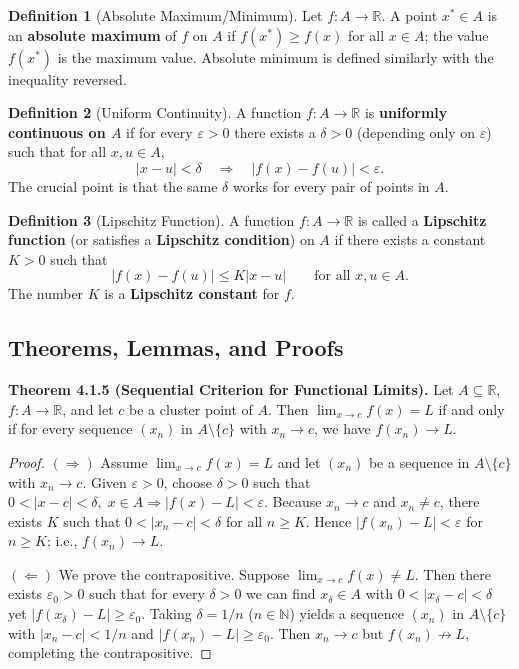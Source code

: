 \documentclass[12pt,a4paper]{article}
\theoremstyle{definition}
\newtheorem*{definition}{Definition}
\newcommand{\R}{\mathbb{R}}
\newcommand{\N}{\mathbb{N}}
\newcommand{\eps}{\varepsilon}
\newcommand{\abs}[1]{\left\lvert#1\right\rvert}
\begin{document}
\begin{definition}[Absolute Maximum/Minimum]
Let \(f:A\to\R\). A point \(x^*\in A\) is an \textbf{absolute maximum} of \(f\) on \(A\) if \(f(x^*)\ge f(x)\) for all \(x\in A\); the value \(f(x^*)\) is the maximum value. Absolute minimum is defined similarly with the inequality reversed.
\end{definition}

\begin{definition}[Uniform Continuity]
A function \(f:A\to\R\) is \textbf{uniformly continuous on \(A\)} if for every \(\eps>0\) there exists a \(\delta>0\) (depending only on \(\eps\)) such that for all \(x,u\in A\),
\[
\abs{x-u}<\delta \quad\Longrightarrow\quad \abs{f(x)-f(u)}<\eps.
\]
The crucial point is that the same \(\delta\) works for every pair of points in \(A\).
\end{definition}

\begin{definition}[Lipschitz Function]
A function \(f:A\to\R\) is called a \textbf{Lipschitz function} (or satisfies a \textbf{Lipschitz condition}) on \(A\) if there exists a constant \(K>0\) such that
\[
\abs{f(x)-f(u)} \le K\abs{x-u} \qquad\text{for all } x,u\in A.
\]
The number \(K\) is a \textbf{Lipschitz constant} for \(f\).
\end{definition}

\subsection{Theorems, Lemmas, and Proofs}

\textbf{Theorem 4.1.5 (Sequential Criterion for Functional Limits).} Let \(A\subseteq\R\), \(f:A\to\R\), and let \(c\) be a cluster point of \(A\). Then \(\lim_{x\to c}f(x)=L\) if and only if for every sequence \((x_n)\) in \(A\setminus\{c\}\) with \(x_n\to c\), we have \(f(x_n)\to L\).

\begin{proof}
\((\Rightarrow)\) Assume \(\lim_{x\to c}f(x)=L\) and let \((x_n)\) be a sequence in \(A\setminus\{c\}\) with \(x_n\to c\). Given \(\eps>0\), choose \(\delta>0\) such that \(0<\abs{x-c}<\delta,\;x\in A \Rightarrow \abs{f(x)-L}<\eps\). Because \(x_n\to c\) and \(x_n\neq c\), there exists \(K\) such that \(0<\abs{x_n-c}<\delta\) for all \(n\ge K\). Hence \(\abs{f(x_n)-L}<\eps\) for \(n\ge K\); i.e., \(f(x_n)\to L\).

\((\Leftarrow)\) We prove the contrapositive. Suppose \(\lim_{x\to c}f(x)\neq L\). Then there exists \(\eps_0>0\) such that for every \(\delta>0\) we can find \(x_\delta\in A\) with \(0<\abs{x_\delta-c}<\delta\) yet \(\abs{f(x_\delta)-L}\ge\eps_0\). Taking \(\delta=1/n\) (\(n\in\N\)) yields a sequence \((x_n)\) in \(A\setminus\{c\}\) with \(\abs{x_n-c}<1/n\) and \(\abs{f(x_n)-L}\ge\eps_0\). Then \(x_n\to c\) but \(f(x_n)\not\to L\), completing the contrapositive.
\end{proof}
\end{document}
